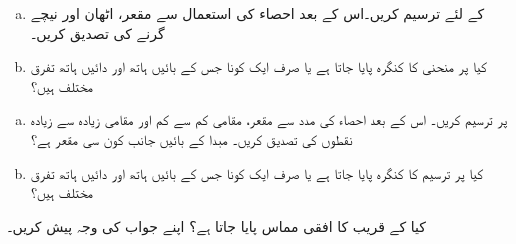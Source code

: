 \begin{enumerate}[a.]
\item
{} کے لئے  ترسیم کریں۔اس کے بعد احصاء کی استعمال سے مقعر، اٹھان اور نیچے گرنے کی تصدیق کریں۔
\item
کیا  پر منحنی کا کنگرہ پایا جاتا ہے یا صرف ایک کونا جس کے بائیں ہاتھ اور دائیں ہاتھ تفرق مختلف ہیں؟
\end{enumerate}
\begin{enumerate}[a.]
\item
{} پر  ترسیم کریں۔ اس کے بعد احصاء کی مدد سے مقعر، مقامی کم سے کم اور مقامی زیادہ سے زیادہ نقطوں کی تصدیق کریں۔ مبدا کے بائیں جانب کون سی مقعر ہے؟
\item
کیا  پر ترسیم کا کنگرہ پایا  جاتا ہے یا صرف ایک کونا جس کے بائیں ہاتھ اور دائیں ہاتھ تفرق مختلف ہیں؟
\end{enumerate}
کیا  کے قریب  کا افقی مماس پایا جاتا ہے؟ اپنے جواب کی وجہ پیش کریں۔

